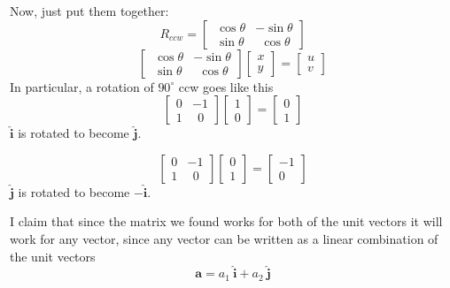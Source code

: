 \documentclass[11pt, oneside]{article}
\begin{document}
Now, just put them together:
\[
R_{ccw} = 
\begin{bmatrix}   \ \cos \theta & -\sin \theta  \\  \ \sin \theta & \ \ \cos \theta  \end{bmatrix}
\]
\[
\begin{bmatrix}   \ \cos \theta & -\sin \theta  \\  \ \sin \theta & \ \ \cos \theta  \end{bmatrix}
\begin{bmatrix}   x   \\  y  \end{bmatrix} = \begin{bmatrix}   u   \\  v  \end{bmatrix}
\]
In particular, a rotation of $90^{\circ}$ ccw goes like this
\[
\begin{bmatrix}   0 & -1  \\  1 & \ \ 0  \end{bmatrix}
\begin{bmatrix}   1   \\  0  \end{bmatrix} = \begin{bmatrix}   0   \\  1  \end{bmatrix}
\]
$\hat{\mathbf{i}}$ is rotated to become $\hat{\mathbf{j}}$.

\[
\begin{bmatrix}   0 & -1  \\  1 & \ \ 0  \end{bmatrix}
\begin{bmatrix}   0   \\  1  \end{bmatrix} = \begin{bmatrix}   -1   \\  0  \end{bmatrix}
\]
$\hat{\mathbf{j}}$ is rotated to become $-\hat{\mathbf{i}}$.

I claim that since the matrix we found works for both of the unit vectors it will work for any vector, since any vector can be written as a linear combination of the unit vectors
\[ \mathbf{a} = a_1 \ \hat{\mathbf{i}} + a_2 \ \hat{\mathbf{j}} \]
\end{document}
